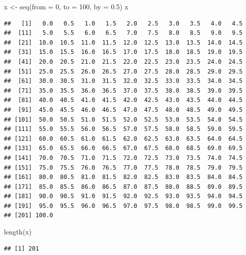 \documentclass[12pt,a4paper]{article}
\newenvironment{Shaded}{\begin{snugshade}}{\end{snugshade}}
\newcommand{\AttributeTok}[1]{\textcolor[rgb]{0.77,0.63,0.00}{#1}}
\newcommand{\DecValTok}[1]{\textcolor[rgb]{0.00,0.00,0.81}{#1}}
\newcommand{\FloatTok}[1]{\textcolor[rgb]{0.00,0.00,0.81}{#1}}
\newcommand{\FunctionTok}[1]{\textcolor[rgb]{0.00,0.00,0.00}{#1}}
\newcommand{\NormalTok}[1]{#1}
\newcommand{\OtherTok}[1]{\textcolor[rgb]{0.56,0.35,0.01}{#1}}
\begin{document}
\begin{Shaded}
\begin{Highlighting}[]
\NormalTok{    x }\OtherTok{\textless{}{-}} \FunctionTok{seq}\NormalTok{(}\AttributeTok{from =} \DecValTok{0}\NormalTok{, }\AttributeTok{to =} \DecValTok{100}\NormalTok{, }\AttributeTok{by =} \FloatTok{0.5}\NormalTok{)}
\NormalTok{    x}
\end{Highlighting}
\end{Shaded}

\begin{verbatim}
##   [1]   0.0   0.5   1.0   1.5   2.0   2.5   3.0   3.5   4.0   4.5
##  [11]   5.0   5.5   6.0   6.5   7.0   7.5   8.0   8.5   9.0   9.5
##  [21]  10.0  10.5  11.0  11.5  12.0  12.5  13.0  13.5  14.0  14.5
##  [31]  15.0  15.5  16.0  16.5  17.0  17.5  18.0  18.5  19.0  19.5
##  [41]  20.0  20.5  21.0  21.5  22.0  22.5  23.0  23.5  24.0  24.5
##  [51]  25.0  25.5  26.0  26.5  27.0  27.5  28.0  28.5  29.0  29.5
##  [61]  30.0  30.5  31.0  31.5  32.0  32.5  33.0  33.5  34.0  34.5
##  [71]  35.0  35.5  36.0  36.5  37.0  37.5  38.0  38.5  39.0  39.5
##  [81]  40.0  40.5  41.0  41.5  42.0  42.5  43.0  43.5  44.0  44.5
##  [91]  45.0  45.5  46.0  46.5  47.0  47.5  48.0  48.5  49.0  49.5
## [101]  50.0  50.5  51.0  51.5  52.0  52.5  53.0  53.5  54.0  54.5
## [111]  55.0  55.5  56.0  56.5  57.0  57.5  58.0  58.5  59.0  59.5
## [121]  60.0  60.5  61.0  61.5  62.0  62.5  63.0  63.5  64.0  64.5
## [131]  65.0  65.5  66.0  66.5  67.0  67.5  68.0  68.5  69.0  69.5
## [141]  70.0  70.5  71.0  71.5  72.0  72.5  73.0  73.5  74.0  74.5
## [151]  75.0  75.5  76.0  76.5  77.0  77.5  78.0  78.5  79.0  79.5
## [161]  80.0  80.5  81.0  81.5  82.0  82.5  83.0  83.5  84.0  84.5
## [171]  85.0  85.5  86.0  86.5  87.0  87.5  88.0  88.5  89.0  89.5
## [181]  90.0  90.5  91.0  91.5  92.0  92.5  93.0  93.5  94.0  94.5
## [191]  95.0  95.5  96.0  96.5  97.0  97.5  98.0  98.5  99.0  99.5
## [201] 100.0
\end{verbatim}

\begin{Shaded}
\begin{Highlighting}[]
    \FunctionTok{length}\NormalTok{(x)}
\end{Highlighting}
\end{Shaded}

\begin{verbatim}
## [1] 201
\end{verbatim}

\vspace{0.5cm}
\end{document}
